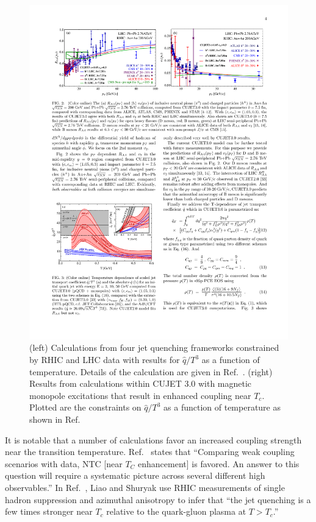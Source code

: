 \begin{figure}[ht]
  \centering
  \hfill
  \includegraphics[width=0.49\linewidth]{figs/figure_cujet_qhat}
  \caption[Calculations of $\hat{q}/T^{3}$ vs temperature, constrained
  by RHIC and LHC \raa data --- including near $T_C$ enhancement
  scenarios of $\hat{q}/T^{3}$]{(left) Calculations from four jet
    quenching frameworks constrained by RHIC and LHC \raa data
    with results for $\hat{q}/T^{3}$ as a function of temperature.
    Details of the calculation are given in
    Ref.~\cite{JETCollaboration:QhatConstraint}. (right)
    Results from calculations within CUJET 3.0 with magnetic monopole
excitations that result in enhanced coupling near $T_{c}$.   Plotted are the constraints on $\hat{q}/T^{3}$ 
as a function of temperature as shown in Ref.~~\cite{Xu:2014tda}
}
  \label{fig:qhatconstraint}
\end{figure}

It is notable that a number of calculations favor an increased coupling strength near the transition temperature.  
Ref.~\cite{Renk:2014nwa} states that ``Comparing weak coupling scenarios with data, 
NTC [near $T_{C}$ enhancement] is favored.   An answer to this question will require a systematic picture 
across several different high \pt observables.''   
In Ref.~\cite{Liao:2008dk}, Liao and Shuryak use 
RHIC measurements of single hadron suppression and azimuthal
anisotropy to infer that ``the jet quenching is a few times stronger
near $T_c$ relative to the quark-gluon plasma at $T > T_c$.''  

